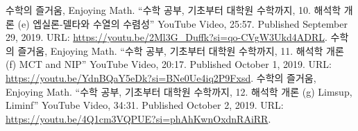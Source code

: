 \documentclass[11pt,openany]{article}
\begin{document}
%	
%		
%		
%		
%		
%		
%		
%	


\vfill

\begin{thebibliography}{9}
	수학의 즐거움, Enjoying Math. ``수학 공부, 기초부터 대학원 수학까지, 10. 해석학 개론 (e) 엡실론-델타와 수열의 수렴성'' YouTube Video, 25:57. Published 
	September 29, 2019. URL: \url{https://youtu.be/2Ml3G_Duffk?si=qo-CVgW3Ukd4ADRL}.
	수학의 즐거움, Enjoying Math. ``수학 공부, 기초부터 대학원 수학까지, 11. 해석학 개론 (f) MCT and NIP'' YouTube Video, 20:17. Published 
	October 1, 2019. URL: \url{https://youtu.be/YdnBQaY5eDk?si=BNe0Ue4iq2P9Fxsd}.
	수학의 즐거움, Enjoying Math. ``수학 공부, 기초부터 대학원 수학까지, 12. 해석학 개론 (g) Limsup, Liminf'' YouTube Video, 34:31. Published 
	October 2, 2019. URL: \url{https://youtu.be/4Q1cm3VQPUE?si=phAhKwnOxdnRAiRR}.
\end{thebibliography}
\end{document}
